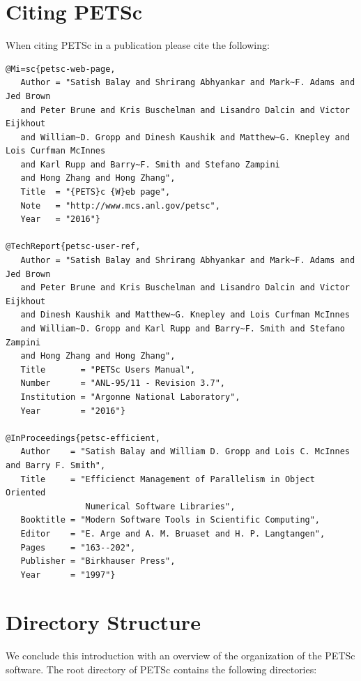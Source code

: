 
\section{Citing PETSc}

When citing PETSc in a publication please cite the following:
\begin{verbatim}
@Mi=sc{petsc-web-page,
   Author = "Satish Balay and Shrirang Abhyankar and Mark~F. Adams and Jed Brown
   and Peter Brune and Kris Buschelman and Lisandro Dalcin and Victor Eijkhout
   and William~D. Gropp and Dinesh Kaushik and Matthew~G. Knepley and Lois Curfman McInnes 
   and Karl Rupp and Barry~F. Smith and Stefano Zampini 
   and Hong Zhang and Hong Zhang",
   Title  = "{PETS}c {W}eb page",
   Note   = "http://www.mcs.anl.gov/petsc",
   Year   = "2016"}

@TechReport{petsc-user-ref,
   Author = "Satish Balay and Shrirang Abhyankar and Mark~F. Adams and Jed Brown
   and Peter Brune and Kris Buschelman and Lisandro Dalcin and Victor Eijkhout
   and Dinesh Kaushik and Matthew~G. Knepley and Lois Curfman McInnes 
   and William~D. Gropp and Karl Rupp and Barry~F. Smith and Stefano Zampini 
   and Hong Zhang and Hong Zhang",
   Title       = "PETSc Users Manual",
   Number      = "ANL-95/11 - Revision 3.7",
   Institution = "Argonne National Laboratory",
   Year        = "2016"}

@InProceedings{petsc-efficient,
   Author    = "Satish Balay and William D. Gropp and Lois C. McInnes and Barry F. Smith",
   Title     = "Efficienct Management of Parallelism in Object Oriented 
                Numerical Software Libraries",
   Booktitle = "Modern Software Tools in Scientific Computing",
   Editor    = "E. Arge and A. M. Bruaset and H. P. Langtangen",
   Pages     = "163--202",
   Publisher = "Birkhauser Press",
   Year      = "1997"}
\end{verbatim}


\section{Directory Structure}

We conclude this introduction with an overview of the
organization of the PETSc software.
The root directory of PETSc contains the following directories:

